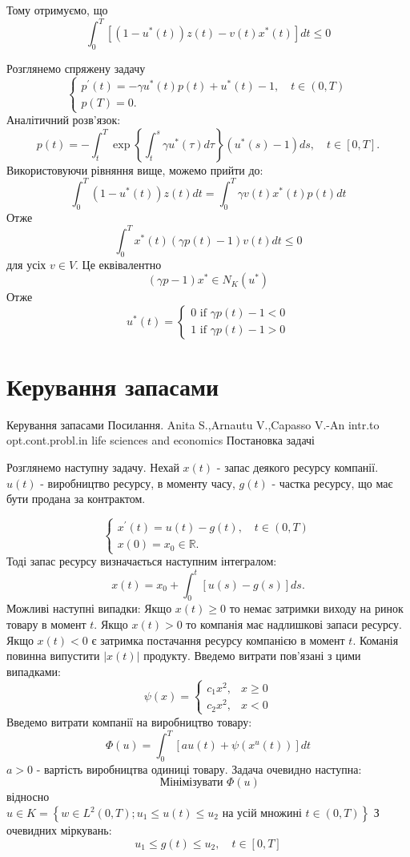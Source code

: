 \documentclass[a4paper,12pt]{extreport}
\begin{document}
Тому отримуємо, що 
$$
\int_0^T\left[\left(1-u^*(t)\right) z(t)-v(t) x^*(t)\right] d t \leq 0
$$

Розглянемо спряжену задачу
$$
\left\{\begin{array}{l}
p^{\prime}(t)=-\gamma u^*(t) p(t)+u^*(t)-1, \quad t \in(0, T) \\
p(T)=0 .
\end{array}\right.
$$Аналітичний розв'язок:
$$
p(t)=-\int_t^T \exp \left\{\int_t^s \gamma u^*(\tau) d \tau\right\}\left(u^*(s)-1\right) d s, \quad t \in[0, T] .
$$
Використовуючи рівняння вище, можемо прийти до:
$$
\int_0^T\left(1-u^*(t)\right) z(t) d t=\int_0^T \gamma v(t) x^*(t) p(t) d t
$$
Отже
$$
\int_0^T x^*(t)(\gamma p(t)-1) v(t) d t \leq 0
$$
для усіх $v \in V$.
Це еквівалентно 
$$
(\gamma p-1) x^* \in N_K\left(u^*\right)
$$
Отже 
$$
u^*(t)=\left\{\begin{array}{l}
0 \text { if } \gamma p(t)-1<0 \\
1 \text { if } \gamma p(t)-1>0
\end{array}\right.
$$







\section{Керування запасами}
Керування запасами
Посилання. Anita S.,Arnautu V.,Capasso V.-An intr.to opt.cont.probl.in life sciences and economics
Постановка задачі

Розглянемо наступну задачу. Нехай $x(t)$ - запас деякого ресурсу компанії. $u(t)$ - виробництво ресурсу, в моменту часу,   $g(t)$ - частка ресурсу, що має бути продана за контрактом.




$$
\left\{\begin{array}{l}
x^{\prime}(t)=u(t)-g(t), \quad t \in(0, T) \\
x(0)=x_0 \in \mathbb{R} .
\end{array}\right.
$$
Тоді запас ресурсу визначається наступним інтегралом:
$$
x(t)=x_0+\int_0^t[u(s)-g(s)] d s .
$$
Можливі наступні випадки:
Якщо  $x(t) \geq 0$ то немає затримки виходу на ринок товару в момент $t$.
Якщо  $x(t)>0$ то компанія має надлишкові запаси ресурсу.
Якщо  $x(t)<0$ є затримка постачання ресурсу компанією в момент $t$. Команія повинна випустити $|x(t)|$ продукту.
Введемо витрати пов'язані з цими випадками:
$$
\psi(x)= \begin{cases}c_1 x^2, & x \geq 0 \\ c_2 x^2, & x<0\end{cases}
$$
Введемо витрати компанії на виробництво товару:
$$
\Phi(u)=\int_0^T\left[a u(t)+\psi\left(x^u(t)\right)\right] d t
$$
$a>0$ - вартість виробництва одиниці товару.
Задача очевидно наступна:
$$
\text { Мінімізувати } \Phi(u)
$$
відносно $u \in K=\left\{w \in L^2(0, T) ; u_1 \leq u(t) \leq u_2 \text { на усій множині } t \in(0, T)\right\}$ 
З очевидних міркувань: 
$$
u_1 \leq g(t) \leq u_2, \quad t \in[0, T]
$$
\end{document}
